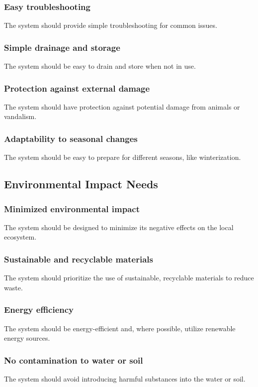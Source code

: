 \documentclass[11pt]{article}
\begin{document}
\subsubsection{Easy troubleshooting}
The system should provide simple troubleshooting for common issues.

\subsubsection{Simple drainage and storage}
The system should be easy to drain and store when not in use.

\subsubsection{Protection against external damage}
The system should have protection against potential damage from animals or vandalism.

\subsubsection{Adaptability to seasonal changes}
The system should be easy to prepare for different seasons, like winterization.

\newpage
\subsection{Environmental Impact Needs}

\subsubsection{Minimized environmental impact}
The system should be designed to minimize its negative effects on the local ecosystem.

\subsubsection{Sustainable and recyclable materials}
The system should prioritize the use of sustainable, recyclable materials to reduce waste.

\subsubsection{Energy efficiency}
The system should be energy-efficient and, where possible, utilize renewable energy sources.

\subsubsection{No contamination to water or soil}
The system should avoid introducing harmful substances into the water or soil.
\end{document}
